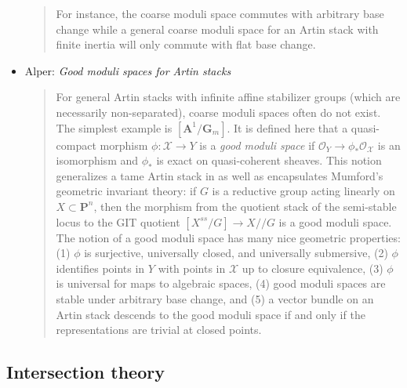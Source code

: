 \begin{itemize}
\begin{quote}
For instance, the coarse moduli space commutes with arbitrary base change while
a general coarse moduli space for an Artin stack with finite inertia will only
commute with flat base change.
\end{quote}
\item Alper: \emph{Good moduli spaces for Artin stacks} \cite{alper_good}
\begin{quote}
For general Artin stacks with infinite affine stabilizer groups (which are
necessarily non-separated), coarse moduli spaces often do not exist. The
simplest example is $[\mathbf{A}^1 / \mathbf{G}_m]$. It is defined here that a
quasi-compact
morphism $\phi : \mathcal{X} \to Y$ is a \emph{good moduli space} if
$\mathcal{O}_Y \to \phi_*
\mathcal{O}_\mathcal{X}$ is an isomorphism and $\phi_*$ is exact on
quasi-coherent sheaves.
This notion generalizes a tame Artin stack in \cite{tame} as well as
encapsulates Mumford's geometric invariant theory: if $G$ is a reductive group
acting linearly on $X \subset \mathbf{P}^n$, then the morphism from the
quotient
stack of the semi-stable locus to the GIT quotient $[X^{ss}/G] \to X//G$ is a
good moduli space. The notion of a good moduli space has many nice geometric
properties: (1) $\phi$ is surjective, universally closed, and universally
submersive, (2) $\phi$ identifies points in $Y$ with points in $\mathcal{X}$ up
to
closure equivalence, (3) $\phi$ is universal for maps to algebraic spaces, (4)
good moduli spaces are stable under arbitrary base change, and (5) a vector
bundle on an Artin stack descends to the good moduli space if and only if the
representations are trivial at closed points.
\end{quote}
\end{itemize}


\subsection{Intersection theory}
\label{subsection-intersection-theory}

